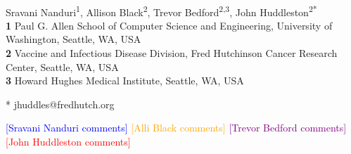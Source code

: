 \documentclass[10pt,letterpaper]{article}
\def\jhc#1{\textcolor{red}{[#1]}}
\def\snc#1{\textcolor{blue}{[#1]}}
\def\tbc#1{\textcolor{purple}{[#1]}}
\def\abc#1{\textcolor{orange}{[#1]}}
\begin{document}
\vspace*{0.2in}

\begin{flushleft}
{\Large
\textbf{} %
}
\newline
\\
Sravani Nanduri\textsuperscript{1},
Allison Black\textsuperscript{2},
Trevor Bedford\textsuperscript{2,3},
John Huddleston\textsuperscript{2*}
\\
\bigskip
\textbf{1} Paul G. Allen School of Computer Science and Engineering, University of Washington, Seattle, WA, USA
\\
\textbf{2} Vaccine and Infectious Disease Division, Fred Hutchinson Cancer Research Center, Seattle, WA, USA
\\
\textbf{3} Howard Hughes Medical Institute, Seattle, WA, USA
\\
\bigskip

%
%





* jhuddles@fredhutch.org

\snc{Sravani Nanduri comments}
\abc{Alli Black comments}
\tbc{Trevor Bedford comments}
\jhc{John Huddleston comments}

\end{flushleft}
\end{document}
